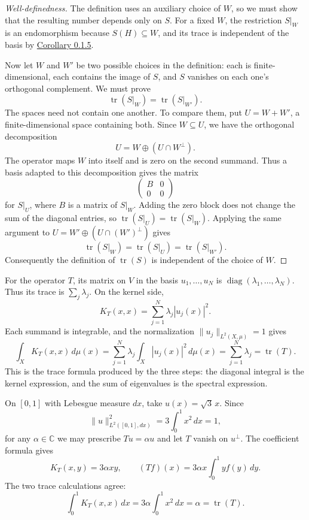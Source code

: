 \begin{proof}[Well-definedness]
The definition uses an auxiliary choice of $W$, so we must show that the resulting number depends only on $S$. For a fixed $W$, the restriction $S|_W$ is an endomorphism because $S(H)\subseteq W$, and its trace is independent of the basis by \hyperref[linear-algebra.trace-similarity]{Corollary 0.1.5}.

Now let $W$ and $W'$ be two possible choices in the definition: each is finite-dimensional, each contains the image of $S$, and $S$ vanishes on each one's orthogonal complement. We must prove
\[
\operatorname{tr}(S|_W)=\operatorname{tr}(S|_{W'}).
\]
The spaces need not contain one another. To compare them, put $U=W+W'$, a finite-dimensional space containing both. Since $W\subseteq U$, we have the orthogonal decomposition
\[
U=W\oplus(U\cap W^\perp).
\]
The operator maps $W$ into itself and is zero on the second summand. Thus a basis adapted to this decomposition gives the matrix
\[
\begin{pmatrix}B&0\\0&0\end{pmatrix}
\]
for $S|_U$, where $B$ is a matrix of $S|_W$. Adding the zero block does not change the sum of the diagonal entries, so $\operatorname{tr}(S|_U)=\operatorname{tr}(S|_W)$. Applying the same argument to $U=W'\oplus(U\cap(W')^\perp)$ gives
\[
\operatorname{tr}(S|_W)=\operatorname{tr}(S|_U)=\operatorname{tr}(S|_{W'}).
\]
Consequently the definition of $\operatorname{tr}(S)$ is independent of the choice of $W$.
\end{proof}

For the operator $T$, its matrix on $V$ in the basis $u_1,\ldots,u_N$ is $\operatorname{diag}(\lambda_1,\ldots,\lambda_N)$. Thus its trace is $\sum_j\lambda_j$. On the kernel side,
\[
K_T(x,x)=\sum_{j=1}^N\lambda_j|u_j(x)|^2.
\]
Each summand is integrable, and the normalization $\|u_j\|_{L^2(X,\mu)}=1$ gives
\[
\int_XK_T(x,x)\,d\mu(x)
=\sum_{j=1}^N\lambda_j\int_X|u_j(x)|^2\,d\mu(x)
=\sum_{j=1}^N\lambda_j
=\operatorname{tr}(T).
\]
This is the trace formula produced by the three steps: the diagonal integral is the kernel expression, and the sum of eigenvalues is the spectral expression.

\begin{example}\label{finite-kernel-rank-one-example}
On $[0,1]$ with Lebesgue measure $dx$, take $u(x)=\sqrt3\,x$. Since
\[
\|u\|_{L^2([0,1],dx)}^2=3\int_0^1x^2\,dx=1,
\]
for any $\alpha\in\mathbb C$ we may prescribe $Tu=\alpha u$ and let $T$ vanish on $u^\perp$. The coefficient formula gives
\[
K_T(x,y)=3\alpha xy,
\qquad
(Tf)(x)=3\alpha x\int_0^1 yf(y)\,dy.
\]
The two trace calculations agree:
\[
\int_0^1K_T(x,x)\,dx=3\alpha\int_0^1x^2\,dx=\alpha=\operatorname{tr}(T).
\]
\end{example}

